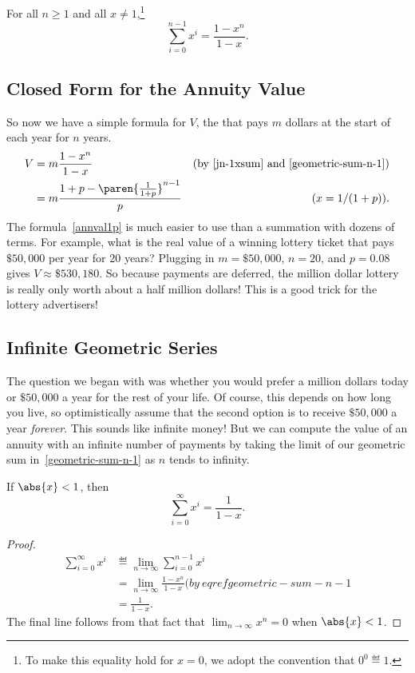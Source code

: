 \begin{theorem}
\label{th:seq}
For all $n \geq 1$ and all $x \neq 1$,\footnote{To make this equality
  hold for $x=0$, we adopt the convention that $0^0 \eqdef 1$.}
\[
\sum_{i=0}^{n-1} x^i = \frac{1- x^n}{1 - x}.
\]
\end{theorem}

\fi
\subsection{Closed Form for the Annuity Value}
So now we have a simple formula for $V$, the  that pays $m$ dollars at the start of each year for $n$ years.
\begin{align}
  V & = m \frac{1 - x^n}{1-x}
      & \text{(by~\eqref{jn-1xsum} and~\eqref{geometric-sum-n-1})}\label{Vmfrac1x}\\
  & = m \frac{1 + p - \paren{\frac{1}{1+p}}^{n-1}}{p}
      & (x = 1/(1+p)).\label{annval1p}
\end{align}
The formula~\eqref{annval1p} is much easier to use than a summation with
dozens of terms.  For example, what is the real value of a winning lottery
ticket that pays $\$50,000$ per year for 20 years?  Plugging in $m =
\$50,000$, $n = 20$, and $p = 0.08$ gives $V \approx \$530,180$.  So
because payments are deferred, the million dollar lottery is really only
worth about a half million dollars!  This is a good trick for the lottery
advertisers!

\subsection{Infinite Geometric Series}

The question we began with was whether you would prefer a million dollars
today or $\$50,000$ a year for the rest of your life.  Of course, this
depends on how long you live, so optimistically assume that the second
option is to receive $\$50,000$ a year \emph{forever}.  This sounds like
infinite money!  But we can compute the value of an annuity with an
infinite number of payments by taking the limit of our geometric sum
in~\eqref{geometric-sum-n-1} as $n$ tends to infinity.
\begin{theorem}\label{th:series}
If $\abs{x} < 1$, then
\[
\sum_{i=0}^\infty x^i = \frac{1}{1-x}.
\]
\end{theorem}

\begin{proof}
\begin{align*}
\sum_{i=0}^\infty x^i
   & \eqdef  \lim_{n \rightarrow \infty} \sum_{i=0}^{n-1} x^i \\
   & = \lim_{n \rightarrow \infty} \frac{1 - x^n}{1-x} (by~eqref{geometric-sum-n-1}\\
   & = \frac{1}{1-x}.  
\end{align*}
The final line follows from that fact that $\lim_{n \rightarrow \infty}
x^n =0$ when $\abs{x} < 1$.
\end{proof}

